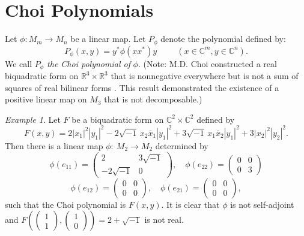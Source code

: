 \documentclass[12pt,a4paper]{amsart}
\theoremstyle{plain}
\theoremstyle{remark}
\newtheorem{example}[theorem]{Example}
\theoremstyle{definition}
\def \C {\mathbb{C}}
\begin{document}
\section{Choi Polynomials}
Let $\phi: M_m \to M_n$ be a linear map. Let $P_{\phi}$ denote the polynomial defined by:$$P_{\phi}(x,y) = y^*\phi(xx^*)y \hspace{1cm} (x\in \mathbb{C}^m, y\in \mathbb{C}^n).$$We call $P_{\phi}$ \textit{the Choi polynomial of} $\phi$. (Note: M.D. Choi constructed a real biquadratic form on $\mathbb{R}^3 \times \mathbb{R}^3$ that is nonnegative everywhere but is not a sum of squares of real bilinear forms \cite{Choi75a}. This result demonstrated the existence of a positive linear map on $M_3$ that is not decomposable.)
\begin{example}
	Let $F$ be a biquadratic form on $\C^2\times \C^2$ defined by
	$$F(x,y) = 2|x_1|^2|y_1|^2 - 2 \sqrt{-1}\, x_2\bar{x}_1|y_1|^2 + 3\sqrt{-1}\, x_1\bar{x}_2 |y_1|^2 + 3|x_2|^2|y_2|^2. $$
	Then there is a linear map $\phi: \ M_2 \to M_2$ determined by
	$$
	\phi(e_{11}) = \left(\begin{array}{ll}
		2 & 3\sqrt{-1}\\
		-2\sqrt{-1}  & 0
	\end{array}\right),  \quad 
	\phi(e_{22}) = \left(\begin{array}{ll}
		0 & 0\\
		0  & 3
	\end{array}\right) 
	$$
	$$
	\phi(e_{12}) = \left(\begin{array}{ll}
		0& 0\\
		0  & 0
	\end{array}\right), \quad
	\phi(e_{21}) =  \left(\begin{array}{ll}
		0 & 0\\
		0  & 0
	\end{array}\right),
	$$
	such that the Choi polynomial is $F(x,y).$ It is clear that $\phi$ is not self-adjoint and 
	$F\left(\left(\begin{array}{c}1\\
		1
	\end{array}
	\right),
	\left(\begin{array}{c}
		1\\
		0
	\end{array}
	\right) \right)= 2 + \sqrt{-1}$ is not real.
\end{example}
\end{document}
